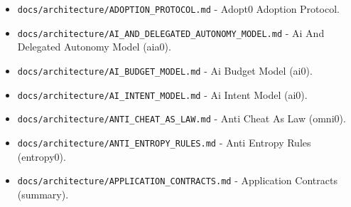 \documentclass[9pt,a4paper,openany]{book}
\begin{document}
\begin{itemize}
\item \texttt{docs/\allowbreak{}architecture/\allowbreak{}ADOPTION\_\allowbreak{}PROTOCOL.\allowbreak{}md} -\allowbreak{} Adopt0 Adoption Protocol.\allowbreak{}
\end{itemize}

\begin{itemize}
\item \texttt{docs/\allowbreak{}architecture/\allowbreak{}AI\_\allowbreak{}AND\_\allowbreak{}DELEGATED\_\allowbreak{}AUTONOMY\_\allowbreak{}MODEL.\allowbreak{}md} -\allowbreak{} Ai And Delegated Autonomy Model (aia0).\allowbreak{}
\end{itemize}

\begin{itemize}
\item \texttt{docs/\allowbreak{}architecture/\allowbreak{}AI\_\allowbreak{}BUDGET\_\allowbreak{}MODEL.\allowbreak{}md} -\allowbreak{} Ai Budget Model (ai0).\allowbreak{}
\end{itemize}

\begin{itemize}
\item \texttt{docs/\allowbreak{}architecture/\allowbreak{}AI\_\allowbreak{}INTENT\_\allowbreak{}MODEL.\allowbreak{}md} -\allowbreak{} Ai Intent Model (ai0).\allowbreak{}
\end{itemize}

\begin{itemize}
\item \texttt{docs/\allowbreak{}architecture/\allowbreak{}ANTI\_\allowbreak{}CHEAT\_\allowbreak{}AS\_\allowbreak{}LAW.\allowbreak{}md} -\allowbreak{} Anti Cheat As Law (omni0).\allowbreak{}
\end{itemize}

\begin{itemize}
\item \texttt{docs/\allowbreak{}architecture/\allowbreak{}ANTI\_\allowbreak{}ENTROPY\_\allowbreak{}RULES.\allowbreak{}md} -\allowbreak{} Anti Entropy Rules (entropy0).\allowbreak{}
\end{itemize}

\begin{itemize}
\item \texttt{docs/\allowbreak{}architecture/\allowbreak{}APPLICATION\_\allowbreak{}CONTRACTS.\allowbreak{}md} -\allowbreak{} Application Contracts (summary).\allowbreak{}
\end{itemize}
\end{document}
